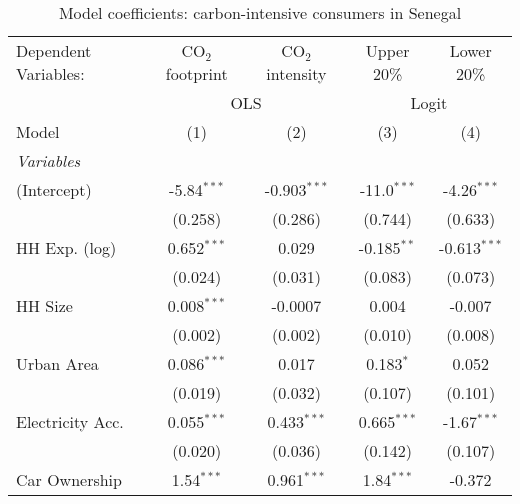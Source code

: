 
\begin{table}[htbp!]
   \centering
   \small
   \begin{adjustbox}{width = 1\textwidth, max height = 0.95\textheight, center}
      \begin{threeparttable}[b]
         \caption{\label{tab:Logit_1_SEN} Model coefficients: carbon-intensive consumers in Senegal}
         \begin{tabular}{lcccc}
            \tabularnewline \midrule \midrule
            Dependent Variables: & CO$_{2}$ footprint & CO$_{2}$ intensity & Upper 20\%    & Lower 20\%\\   
             & \multicolumn{2}{c}{OLS} & \multicolumn{2}{c}{Logit} \\ 
            Model                & (1)                & (2)                & (3)           & (4)\\  
            \midrule
            \emph{Variables}\\
            (Intercept)          & -5.84$^{***}$      & -0.903$^{***}$     & -11.0$^{***}$ & -4.26$^{***}$\\   
                                 & (0.258)            & (0.286)            & (0.744)       & (0.633)\\   
            HH Exp. (log)        & 0.652$^{***}$      & 0.029              & -0.185$^{**}$ & -0.613$^{***}$\\   
                                 & (0.024)            & (0.031)            & (0.083)       & (0.073)\\   
            HH Size              & 0.008$^{***}$      & -0.0007            & 0.004         & -0.007\\   
                                 & (0.002)            & (0.002)            & (0.010)       & (0.008)\\   
            Urban Area           & 0.086$^{***}$      & 0.017              & 0.183$^{*}$   & 0.052\\   
                                 & (0.019)            & (0.032)            & (0.107)       & (0.101)\\   
            Electricity Acc.     & 0.055$^{***}$      & 0.433$^{***}$      & 0.665$^{***}$ & -1.67$^{***}$\\   
                                 & (0.020)            & (0.036)            & (0.142)       & (0.107)\\   
            Car Ownership        & 1.54$^{***}$       & 0.961$^{***}$      & 1.84$^{***}$  & -0.372\\   

\end{tabular}
\end{threeparttable}
\end{adjustbox}
\end{table}
